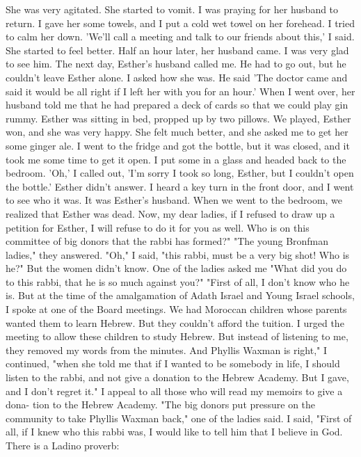 She was very 
agitated.
She started to vomit.
I was praying for her husband to 
return.
I gave her some towels, and I put a cold wet towel on her 
forehead.
I tried to calm her down.
'We'll call a meeting and talk to our friends about this,' I said.
She started to feel better.
Half an hour later, her husband came.
I was very glad to see him.
The next day, Esther's husband called me.
He had to go out, 
but he couldn't leave Esther alone.
I asked how she was.
He said 
'The doctor came and said it would be all right if I left her with 
you for an hour.'
When I went over, her husband told me that he 
had prepared a deck of cards so that we could play gin rummy.
Esther was sitting in bed, propped up by two pillows.
We played,
Esther won, and she was very happy.
She felt much better, and she 
asked me to get her some ginger ale.
I went to the fridge and got 
the bottle, but it was closed, and it took me some time to get it 
open.
I put some in a glass and headed back to the bedroom.
'Oh,' I called out, 'I'm sorry I took so long, Esther, but I 
couldn't open the bottle.'
Esther didn't answer.
I heard a key turn 
in the front door, and I went to see who it was.
It was Esther's 
husband.
When we went to the bedroom, we realized that Esther was 
dead.
Now, my dear ladies, if I refused to draw up a petition for 
Esther, I will refuse to do it for you as well.
Who is on this 
committee of big donors that the rabbi has formed?"
"The young Bronfman ladies," they answered.
"Oh," I said, "this rabbi, must be a very big shot!
Who is he?"
But the women didn't know.
One of the ladies asked me "What did you do to this rabbi, 
that he is so much against you?"
"First of all, I don't know who he is.
But at the time of the 
amalgamation of Adath Israel and Young Israel schools, I spoke at 
one of the Board meetings.
We had Moroccan children whose parents 
wanted them to learn Hebrew.
But they couldn't afford the tuition.
I urged the meeting to allow these children to study Hebrew.
But 
instead of listening to me, they removed my words from the minutes.
And Phyllis Waxman is right," I continued, "when she told me that 
if I wanted to be somebody in life, I should listen to the rabbi, 
and not give a donation to the Hebrew Academy.
But I gave, and I 
don't regret it."
I appeal to all those who will read my memoirs to give a dona-
tion to the Hebrew Academy.
"The big donors put pressure on the community to take Phyllis 
Waxman back," one of the ladies said.
I said, "First of all, if I knew who this rabbi was, I would 
like to tell him that I believe in God.
There is a Ladino proverb: 
